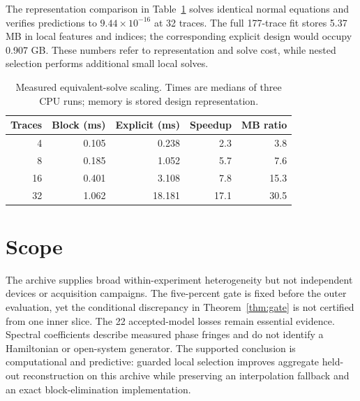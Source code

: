 \documentclass[10pt,letterpaper,twoside]{article}
\begin{document}
The representation comparison in Table~\ref{tab:compute} solves identical
normal equations and verifies predictions to $9.44\times10^{-16}$ at 32
traces. The full 177-trace fit stores 5.37 MB in local features and indices;
the corresponding explicit design would occupy 0.907 GB. These numbers refer
to representation and solve cost, while nested selection performs additional
small local solves.

\begin{table}[b]
\caption{Measured equivalent-solve scaling. Times are medians of three CPU
runs; memory is stored design representation.}
\label{tab:compute}
\begin{ruledtabular}\begin{tabular}{rrrrr}
Traces & Block (ms) & Explicit (ms) & Speedup & MB ratio\\ \hline
4 & 0.105 & 0.238 & 2.3 & 3.8\\
8 & 0.185 & 1.052 & 5.7 & 7.6\\
16 & 0.401 & 3.108 & 7.8 & 15.3\\
32 & 1.062 & 18.181 & 17.1 & 30.5
\end{tabular}\end{ruledtabular}
\end{table}

\section{Scope}

The archive supplies broad within-experiment heterogeneity but not independent
devices or acquisition campaigns. The five-percent gate is fixed before the
outer evaluation, yet the conditional discrepancy in
Theorem~\ref{thm:gate} is not certified from one inner slice. The 22
accepted-model losses remain essential evidence. Spectral coefficients
describe measured phase fringes and do not identify a Hamiltonian or
open-system generator. The supported conclusion is computational and
predictive: guarded local selection improves aggregate held-out reconstruction
on this archive while preserving an interpolation fallback and an exact
block-elimination implementation.



\end{document}
